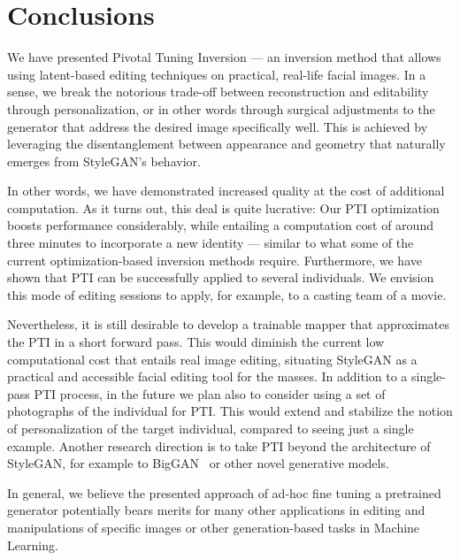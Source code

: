 \section{Conclusions}

We have presented Pivotal Tuning Inversion --- an inversion method that allows using latent-based editing techniques on practical, real-life facial images. In a sense, we break the notorious trade-off between reconstruction and editability through personalization, or in other words through surgical adjustments to the generator that address the desired image specifically well. This is achieved by leveraging the disentanglement between appearance and geometry that naturally emerges from StyleGAN's behavior. 

In other words, we have demonstrated increased quality at the cost of additional computation. As it turns out, this deal is quite lucrative: Our PTI optimization boosts performance considerably, while entailing a computation cost of around three minutes to incorporate a new identity --- similar to what some of the current optimization-based inversion methods require. Furthermore, we have shown that PTI can be successfully applied to several individuals. We envision this mode of editing sessions to apply, for example, to a casting team of a movie.

Nevertheless, it is still desirable to develop a trainable mapper that approximates the PTI in a short forward pass. This would diminish the current low computational cost that entails real image editing, situating StyleGAN as a practical and accessible facial editing tool for the masses. In addition to a single-pass PTI process, in the future we plan also to consider using a set of photographs of the individual for PTI. This would extend and stabilize the notion of personalization of the target individual, compared to seeing just a single example. Another research direction is to take PTI beyond the architecture of StyleGAN, for example to BigGAN~\cite{brock2018large} or other novel generative models. 

In general, we believe the presented approach of ad-hoc fine tuning a pretrained generator potentially bears merits for many other applications in editing and manipulations of specific images or other generation-based tasks in Machine Learning.


